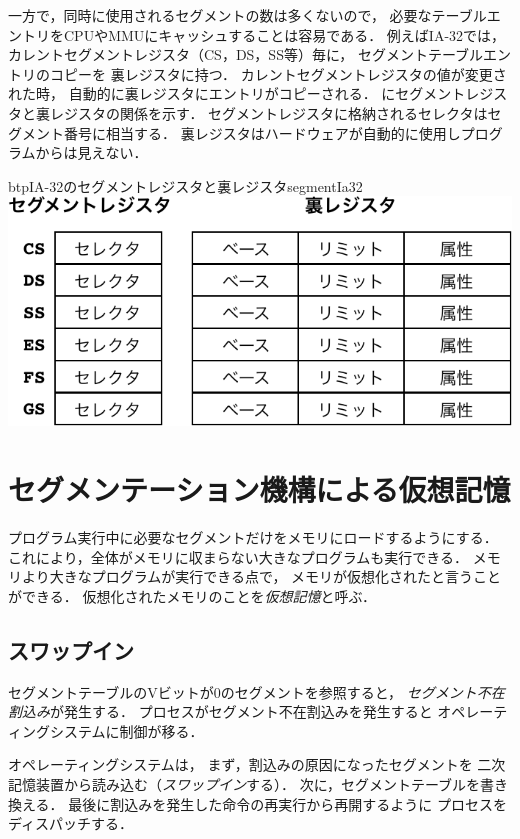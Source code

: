 一方で，同時に使用されるセグメントの数は多くないので，
必要なテーブルエントリをCPUやMMUにキャッシュすることは容易である．
例えばIA-32では，
カレントセグメントレジスタ（CS，DS，SS等）毎に，
セグメントテーブルエントリのコピーを
裏レジスタ\cite{ia32SegmentHiddenReg}に持つ．
カレントセグメントレジスタの値が変更された時，
自動的に裏レジスタにエントリがコピーされる．
にセグメントレジスタと裏レジスタの関係を示す．
セグメントレジスタに格納されるセレクタはセグメント番号に相当する．
裏レジスタはハードウェアが自動的に使用しプログラムからは見えない．

\begin{myfig}{btp}{IA-32のセグメントレジスタと裏レジスタ}{segmentIa32}
  \includegraphics[scale=0.8]{Fig/segmentIa32-crop.pdf}
\end{myfig}

\section{セグメンテーション機構による仮想記憶}
プログラム実行中に必要なセグメントだけをメモリにロードするようにする．
これにより，全体がメモリに収まらない大きなプログラムも実行できる．
メモリより大きなプログラムが実行できる点で，
メモリが仮想化されたと言うことができる．
仮想化されたメモリのことを\emph{仮想記憶}と呼ぶ．

\subsection{スワップイン}
セグメントテーブルのVビットが0のセグメントを参照すると，
\emph{セグメント不在割込み}が発生する．
プロセスがセグメント不在割込みを発生すると
オペレーティングシステムに制御が移る．

オペレーティングシステムは，
まず，割込みの原因になったセグメントを
二次記憶装置から読み込む（\emph{スワップイン}する）．
次に，セグメントテーブルを書き換える．
最後に割込みを発生した命令の再実行から再開するように
プロセスをディスパッチする．

